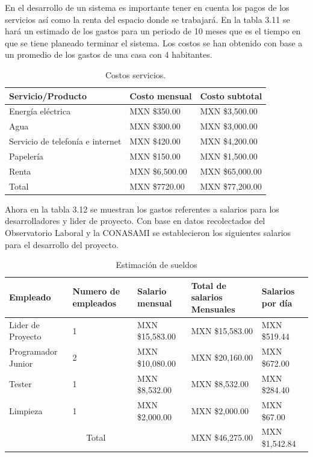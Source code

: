 \documentclass[12pt]{report}
\begin{document}
En el desarrollo de un sistema es importante tener en cuenta los pagos de los servicios así como la renta del espacio donde se trabajará. En la tabla 3.11 se hará un estimado de los gastos para un periodo de 10 meses que es el tiempo en que se tiene planeado terminar el sistema. Los costos se han obtenido con base a un promedio de los gastos de una casa con 4 habitantes.
\begin{table}[H]
\begin{center}
\begin{tabular}{p{60mm}p{40mm}p{40mm}}
\hline
Servicio/Producto & Costo mensual & Costo subtotal \\
\hline \hline 
Energía eléctrica & MXN \$350.00 & MXN \$3,500.00\\
Agua & MXN \$300.00 & MXN \$3,000.00\\
Servicio de telefonía e internet & MXN \$420.00 & MXN \$4,200.00 \\
Papelería & MXN \$150.00 & MXN \$1,500.00\\
Renta & MXN \$6,500.00 & MXN \$65,000.00 \\
\hline \hline
Total & MXN \$7720.00 & MXN \$77,200.00\\
\hline
\end{tabular}
\caption{Costos servicios.}
\end{center}
\end{table}

Ahora en la tabla 3.12 se muestran los gastos referentes a salarios para los desarrolladores y lider de proyecto. Con base en datos recolectados del Observatorio Laboral\cite{obse} y la CONASAMI\cite{conas} se establecieron los siguientes salarios para el desarrollo del proyecto.

\begin{table}[H]
\begin{center}
\begin{tabular}{p{40mm}p{20mm}p{30mm}p{30mm}p{30mm}}
\hline
Empleado & Numero de empleados & Salario mensual & Total de salarios Mensuales & Salarios por día \\
\hline \hline
Lider de Proyecto & 1 & MXN \$15,583.00 & MXN \$15,583.00 & MXN \$519.44\\
Programador Junior & 2 & MXN \$10,080.00 & MXN \$20,160.00 & MXN \$672.00 \\
Tester & 1 & MXN \$8,532.00 & MXN \$8,532.00 &  MXN \$284.40 \\
Limpieza & 1 & MXN \$2,000.00 & MXN \$2,000.00 & MXN \$67.00 \\
\hline \hline
\multicolumn{3}{c|}{Total} & MXN \$46,275.00 & MXN \$1,542.84 \\
\hline
\end{tabular}
\caption{Estimación de sueldos}
\end{center}
\end{table}
\end{document}
